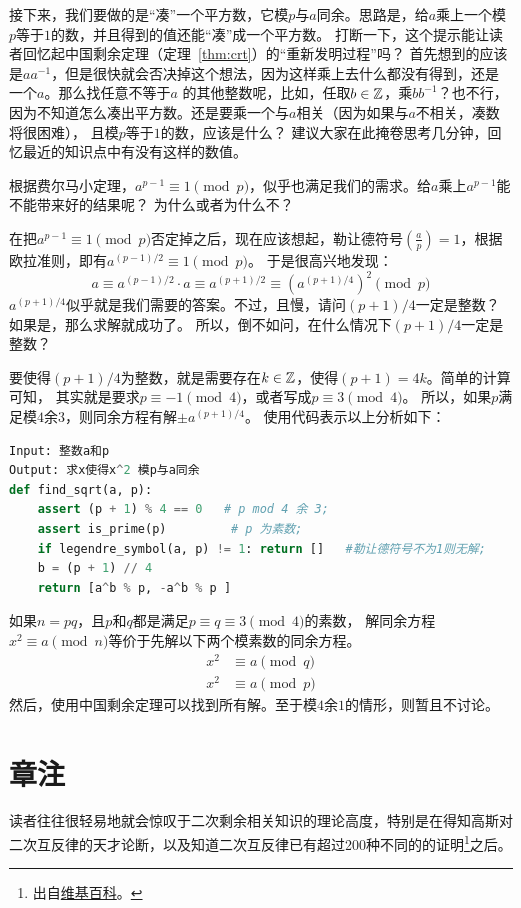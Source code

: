 接下来，我们要做的是“凑”一个平方数，它模$p$与$a$同余。思路是，给$a$乘上一个模$p$等于$1$的数，并且得到的值还能“凑”成一个平方数。
打断一下，这个提示能让读者回忆起中国剩余定理（定理~\ref{thm:crt}）的“重新发明过程”吗？
首先想到的应该是$a a^{-1}$，但是很快就会否决掉这个想法，因为这样乘上去什么都没有得到，还是一个$a$。那么找任意不等于$a$
的其他整数呢，比如，任取$b\in {\mathbb Z}$，乘$b b^{-1}$？也不行，因为不知道怎么凑出平方数。还是要乘一个与$a$相关（因为如果与$a$不相关，凑数将很困难），
且模$p$等于$1$的数，应该是什么？
建议大家在此掩卷思考几分钟，回忆最近的知识点中有没有这样的数值。

\begin{thinking}
根据费尔马小定理，$a^{p-1} \equiv 1 \pmod{p}$，似乎也满足我们的需求。给$a$乘上$a^{p-1}$能不能带来好的结果呢？
为什么或者为什么不？
\end{thinking}

在把$a^{p-1} \equiv 1 \pmod{p}$否定掉之后，现在应该想起，勒让德符号$\left( \frac{a}{p} \right) = 1$，根据欧拉准则，即有$a^{(p-1)/2} \equiv 1 \pmod{p}$。
于是很高兴地发现：
 \[a \equiv a^{(p-1)/2}\cdot a \equiv a^{(p+1)/2} \equiv (a^{(p+1)/4})^2  \pmod{p} \]
$a^{(p+1)/4} $似乎就是我们需要的答案。不过，且慢，请问$(p+1)/4$一定是整数？如果是，那么求解就成功了。
所以，倒不如问，在什么情况下$(p+1)/4$一定是整数？

要使得$(p+1)/4$为整数，就是需要存在$k \in {\mathbb Z}$，使得$(p + 1) = 4k$。简单的计算可知，
其实就是要求$p \equiv -1 \pmod{4}$，或者写成$p \equiv 3 \pmod{4}$。
所以，如果$p$满足模$4$余$3$，则同余方程有解$\pm a^{(p+1)/4}$。
使用代码表示以上分析如下：
\begin{lstlisting}[language=Python]
Input: 整数a和p
Output: 求x使得x^2 模p与a同余
def find_sqrt(a, p):
    assert (p + 1) % 4 == 0   # p mod 4 余 3;
    assert is_prime(p)         # p 为素数;
    if legendre_symbol(a, p) != 1: return []   #勒让德符号不为1则无解;
    b = (p + 1) // 4
    return [a^b % p, -a^b % p ] 
\end{lstlisting}
 
 如果$n = pq$，且$p$和$q$都是满足$p \equiv q \equiv 3 \pmod{4}$的素数，
 解同余方程$ x^2 \equiv a \pmod{n}$等价于先解以下两个模素数的同余方程。
\begin{align*}
 x^ 2 &\equiv a \pmod{q} \\
 x^2 &\equiv a \pmod{p}
 \end{align*}
 然后，使用中国剩余定理可以找到所有解。至于模$4$余$1$的情形，则暂且不讨论。
 
 \section*{章注}
 读者往往很轻易地就会惊叹于二次剩余相关知识的理论高度，特别是在得知高斯对二次互反律的天才论断，以及知道二次互反律已有超过200种不同的的证明\footnote{出自\href{https://zh.wikipedia.org/zh-sg/二次互反律}{维基百科}。}之后。
 
